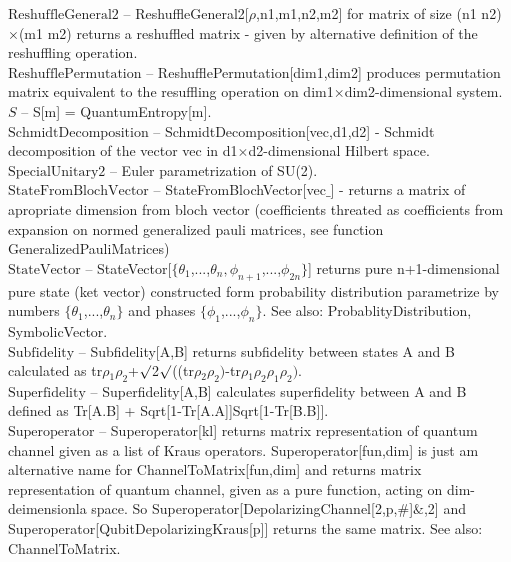 \documentclass[a4paper,11pt]{article}
\begin{document}
\textbf{$ \text{ReshuffleGeneral2} $ }-- ReshuffleGeneral2[$\rho $,n1,m1,n2,m2] for matrix of size (n1 n2)$\times $(m1 m2) returns a reshuffled matrix - given by alternative definition of the reshuffling operation.$  $\\

\textbf{$ \text{ReshufflePermutation} $ }-- ReshufflePermutation[dim1,dim2] produces permutation matrix equivalent to the resuffling operation on dim1$\times $dim2-dimensional system.$  $\\

\textbf{$ S $ }-- S[m] = QuantumEntropy[m].$  $\\

\textbf{$ \text{SchmidtDecomposition} $ }-- SchmidtDecomposition[vec,d1,d2] - Schmidt decomposition of the vector vec in d1$\times $d2-dimensional Hilbert space.$  $\\

\textbf{$ \text{SpecialUnitary2} $ }-- Euler parametrization of SU(2).$  $\\

\textbf{$ \text{StateFromBlochVector} $ }-- StateFromBlochVector[vec$\_$] - returns a matrix of apropriate dimension from bloch vector (coefficients threated as coefficients from expansion on normed generalized pauli matrices, see function GeneralizedPauliMatrices)$  $\\

\textbf{$ \text{StateVector} $ }-- StateVector[$\{$$ \theta _1 $,...,$ \theta _n,\phi _{n+1} $,...,$ \phi _{2 n} $$\}$] returns pure n+1-dimensional pure state (ket vector) constructed form probability distribution parametrize by numbers $\{$$ \theta _1 $,...,$ \theta _n $$\}$ and phases $\{$$ \phi _1 $,...,$ \phi _n $$\}$. See also: ProbablityDistribution, SymbolicVector.$  $\\

\textbf{$ \text{Subfidelity} $ }-- Subfidelity[A,B] returns subfidelity between states A and B calculated as $  $tr$\rho $$ _1\rho _2 $+$\surd $2$\surd $(($  $tr$\rho $$ _2\rho _2\text{)-} $tr$\rho $$ _1\rho _2\rho _1\rho _2\text{).} $\\

\textbf{$ \text{Superfidelity} $ }-- Superfidelity[A,B] calculates superfidelity between A and B defined as Tr[A.B] + Sqrt[1-Tr[A.A]]Sqrt[1-Tr[B.B]].$  $\\

\textbf{$ \text{Superoperator} $ }-- Superoperator[kl] returns matrix representation of quantum channel given as a list of Kraus operators. Superoperator[fun,dim] is just am alternative name for ChannelToMatrix[fun,dim] and returns matrix representation of quantum channel, given as a pure function, acting on dim-deimensionla space. So Superoperator[DepolarizingChannel[2,p,$\#$]$\&$,2] and Superoperator[QubitDepolarizingKraus[p]] returns the same matrix. See also: ChannelToMatrix.$  $\\
\end{document}
